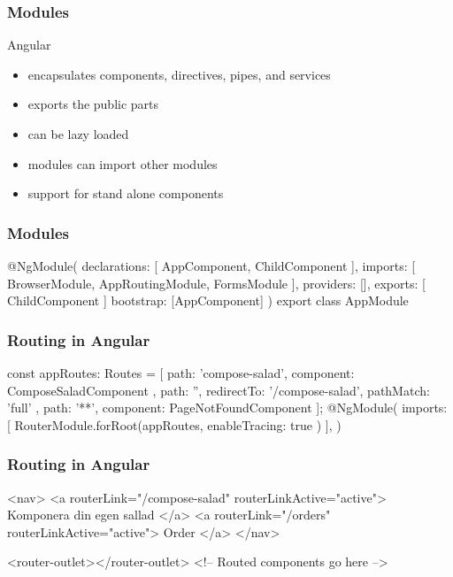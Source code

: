 \begin{frame}[fragile] \frametitle{Modules}
\vspace{5mm}
Angular
\begin{itemize}
  \item encapsulates components, directives, pipes, and services
  \item exports the public parts
  \item can be lazy loaded
  \item modules can import other modules
  \item support for stand alone components
\end{itemize}
\end{frame}

\begin{frame}[fragile] \frametitle{Modules}
\begin{CodeBox}{}
@NgModule({
  declarations: [
    AppComponent,
    ChildComponent
  ],
  imports: [
    BrowserModule,
    AppRoutingModule,
    FormsModule
  ],
  providers: [],
  exports:      [ ChildComponent ]
  bootstrap: [AppComponent]
})
export class AppModule { }

\end{CodeBox}
\end{frame}

\begin{frame}[fragile] \frametitle{Routing in Angular}
\begin{CodeBox}{}
const appRoutes: Routes = [
  { path: 'compose-salad', component: ComposeSaladComponent },
  { path: '',
    redirectTo: '/compose-salad',
    pathMatch: 'full'
  },
  { path: '**', component: PageNotFoundComponent }
];
@NgModule({
  imports: [
    RouterModule.forRoot(appRoutes, { enableTracing: true })
  ],
})
\end{CodeBox}
\end{frame}

\begin{frame}[fragile] \frametitle{Routing in Angular}
\begin{CodeBox}{}
<nav>
  <a routerLink="/compose-salad" routerLinkActive="active">
    Komponera din egen sallad
  </a>
  <a routerLink="/orders" routerLinkActive="active">
    Order
  </a>
</nav>

<router-outlet></router-outlet>
<!-- Routed components go here -->
\end{CodeBox}
\end{frame}

